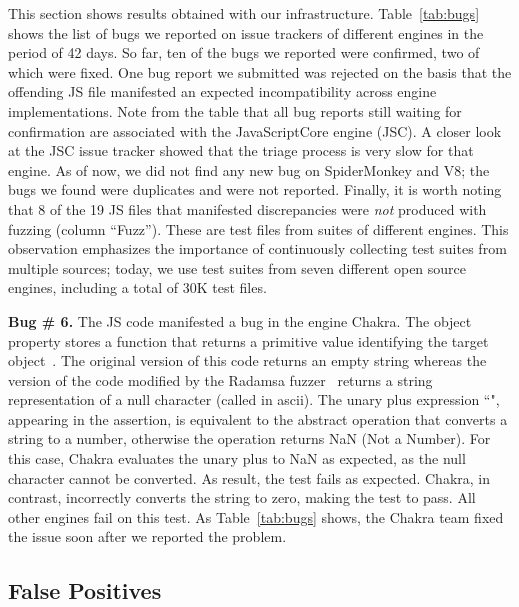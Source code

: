 \documentclass[10pt,conference,anonymous]{IEEEtran}
\begin{document}
This section shows results obtained with our
infrastructure. Table~\ref{tab:bugs} shows the list of bugs we
reported on issue trackers of different engines in the period of 42
days. So far, ten of the bugs we reported
were confirmed, two of which were fixed. One bug report we
submitted was rejected on the basis that the offending JS file
manifested an expected incompatibility across engine
implementations.
Note from the table that all bug
reports still waiting for confirmation are associated with the
JavaScriptCore engine (JSC). A closer look at the JSC issue tracker
showed that the triage process is very slow for that engine. As of
now, we did not find any new bug on SpiderMonkey and V8; the bugs we
found were duplicates and were not reported. Finally, it is
worth noting that 8 of the 19 JS files that manifested
discrepancies were \emph{not} produced with fuzzing (column
``Fuzz''). These are test files from suites of different engines. This
observation emphasizes the importance of continuously collecting test suites from
multiple sources; today, we use test suites from seven different open
source engines, including a total of 30K test files.

 

\vspace{1ex}\noindent\textbf{Bug \# 6.} The JS code  
manifested a bug in the \js{} engine Chakra.  The object
property  stores a function that returns a primitive
value identifying the target object~\cite{valueof}. The original
version of this code returns an empty string whereas the version of
the code modified by the Radamsa fuzzer~\cite{radamsa} returns a string
representation of a null character (called  in ascii). The
unary plus expression ``", appearing in the assertion, is
equivalent to the abstract operation 
that converts a string to a number, otherwise the operation returns
NaN (Not a Number)\cite{unary-plus}. For this case, Chakra evaluates
the unary plus to NaN as expected, as the null character cannot be
converted. As result, the test fails as expected. Chakra, in contrast,
incorrectly converts the string to zero, making the test to pass. All
other engines fail on this test. As Table~\ref{tab:bugs} shows, the
Chakra team fixed the issue soon after we reported the problem.

\subsection{False Positives}
\end{document}
